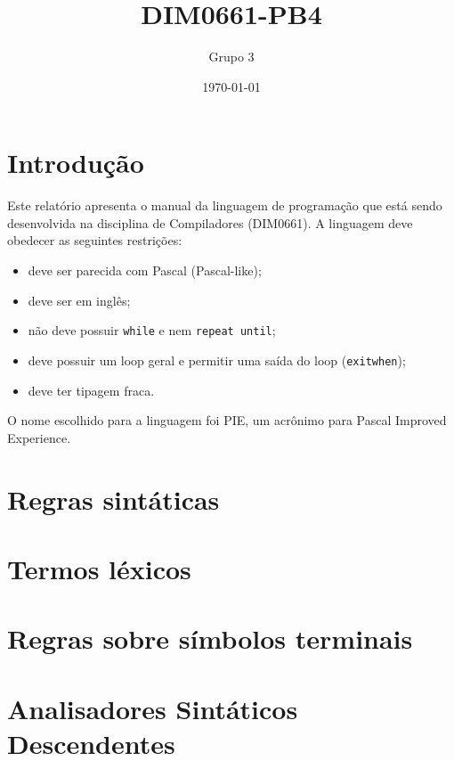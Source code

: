 \documentclass[12pt]{report}
\title{DIM0661-PB4}
\author{Grupo 3}
\date{\today}
\begin{document}
\maketitle

\tableofcontents

\chapter{Introdução}
Este relatório apresenta o manual da linguagem de programação que está sendo desenvolvida na disciplina de Compiladores (DIM0661). A linguagem deve obedecer as seguintes restrições:

\begin{changemargin}{1cm}{1cm}
\begin{itemize}
    \item deve ser parecida com Pascal (Pascal-like);
    \item deve ser em inglês;
    \item não deve possuir \texttt{while} e nem \texttt{repeat until};
    \item deve possuir um loop geral e permitir uma saída do loop (\texttt{exitwhen});
    \item deve ter tipagem fraca.
\end{itemize}
\end{changemargin}

O nome escolhido para a linguagem foi PIE, um acrônimo para Pascal Improved Experience.

\chapter{Regras sintáticas}\label{ch:sintatica}


\newpage
\chapter{Termos léxicos}


\newpage
\chapter{Regras sobre símbolos terminais}


\newpage
\chapter{Analisadores Sintáticos Descendentes}

\end{document}
